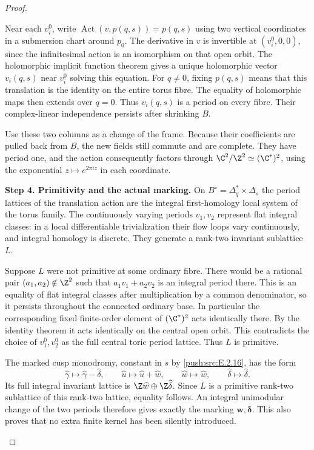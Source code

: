 \begin{proof}
\begin{enumerate}[label={$\langle1\rangle$\arabic*.},leftmargin=*]
Near each $v_i^0$, write
$\operatorname{Act}(v,p(q,s))=p(q,s)$
using two vertical coordinates
in a submersion chart around
$p_0$.  The derivative in $v$
is invertible at $(v_i^0,0,0)$,
since the infinitesimal action
is an isomorphism on that open
orbit.  The holomorphic implicit
function theorem gives a unique
holomorphic vector $v_i(q,s)$
near $v_i^0$ solving this equation.
For $q\ne0$, fixing $p(q,s)$
means that this translation is
the identity on the entire
torus fibre.  The equality of
holomorphic maps then extends
over $q=0$.  Thus $v_i(q,s)$
is a period on every fibre.
Their complex-linear
independence persists after
shrinking $B$.

Use these two columns as a
change of the frame.  Because
their coefficients are pulled
back from $B$, the new fields
still commute and are complete.
They have period one, and the
action consequently factors
through
$\C^2/\Z^2\simeq(\C^*)^2$,
using the exponential
$z\mapsto e^{2\pi i z}$
in each coordinate.

\noindent\textbf{Step 4. Primitivity and the actual marking.}
On $B^\circ=\Delta_q^*\times\Delta_s$
the period lattices of the
translation action are the
integral first-homology local
system of the torus family.
The continuously varying
periods $v_1,v_2$ represent
flat integral classes: in a
local differentiable
trivialization their flow
loops vary continuously, and
integral homology is discrete.
They generate a rank-two
invariant sublattice $L$.

Suppose $L$ were not primitive
at some ordinary fibre.  There
would be a rational pair
$(a_1,a_2)\notin\Z^2$ such
that $a_1v_1+a_2v_2$ is an
integral period there.  This
is an equality of flat
integral classes after
multiplication by a common
denominator, so it persists
throughout the connected
ordinary base.  In particular
the corresponding fixed
finite-order element of
$(\C^*)^2$ acts identically
there.  By the identity
theorem it acts identically
on the central open orbit.
This contradicts the choice
of $v_1^0,v_2^0$ as the full
central toric period lattice.
Thus $L$ is primitive.

The marked cusp monodromy,
constant in $s$ by \ref{push:src:E.2.16},
has the form
\[
 \widehat\gamma\longmapsto
       \widehat\gamma-\widehat\delta,
 \qquad
 \widehat u\longmapsto\widehat u+\widehat w,
 \qquad
 \widehat w\longmapsto\widehat w,
 \qquad
 \widehat\delta\longmapsto\widehat\delta.
 \tag{E.2.19.6}
\]
Its full integral invariant
lattice is
$\Z\widehat w\oplus\Z\widehat\delta$.
Since $L$ is a primitive
rank-two sublattice of this
rank-two lattice, equality
follows.  An integral
unimodular change of the two
periods therefore gives
exactly the marking
$\mathbf w,\boldsymbol\delta$.
This also proves that no
extra finite kernel has been
silently introduced.


\end{enumerate}
\end{proof}
